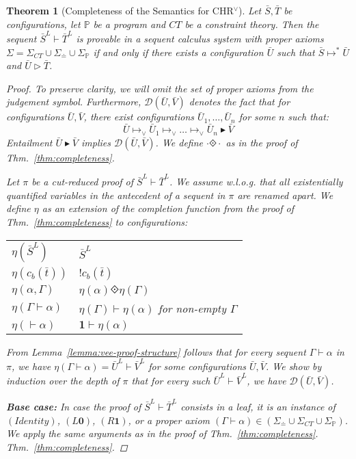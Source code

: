 \documentclass[acmtocl]{acmtrans2m}
\newtheorem{theorem}{Theorem}[section]
\newcommand\ent{\rhd}
\newcommand\entv{\blacktriangleright}
\newcommand{\bbP}{\ensuremath{\mathbb{P}}}
\newcommand{\cD}{\ensuremath{\mathcal{D}}}
\newcommand{\cb}{\ensuremath{c_b(\bar t)}}
\newcommand{\Sct}{\ensuremath{\Sigma_{CT}}}
\newcommand{\Seq}{\ensuremath{\Sigma_{\doteq}}}
\newcommand{\Sp}{\ensuremath{\Sigma_\mathbb{P}}}
\newcommand{\bS}{\bar{S}}
\newcommand{\bT}{\bar{T}}
\newcommand{\bU}{\bar{U}}
\newcommand{\bV}{\bar{V}}
\newcommand{\lone}{\boldsymbol{1}}
\newcommand{\lzero}{\boldsymbol{0}}
\begin{document}
\begin{theorem}[Completeness of the Semantics for CHR$^\vee$]
\label{thm:vee-completeness}
   Let $\bS,\bT$ be configurations, let $\bbP$ be a program and $CT$ be a
   constraint theory. Then the sequent $\bS^L\vdash \bT^L$ is provable in a
   sequent calculus system with proper axioms $\Sigma=\Sct\cup\Seq\cup\Sp$
   \emph{if and only if} there exists a configuration $\bU$ such that
   $\bS\mapsto^{*} \bU$ and $\bU\ent \bT$.

\begin{proof}
To preserve clarity, we will omit the set of proper axioms from the judgement
symbol. Furthermore, $\cD(\bU,\bV)$ denotes the fact that for configurations
$\bU,\bV$,  there exist configurations $\bU_1,\ldots,\bU_n$ for some $n$ such
that:
	\[
		\bU \mapsto_\vee \bU_1 \mapsto_\vee \ldots \mapsto_\vee \bU_n \entv \bV
	\]
Entailment $\bU\entv \bV$ implies $\cD(\bU,\bV)$. We define
$\cdot\Diamonddot\cdot$ as in the proof of Thm.~\ref{thm:completeness}.

Let $\pi$ be a cut-reduced proof of $\bS^L\vdash \bT^L$.
We assume w.l.o.g. that all existentially quantified variables
in the antecedent of a sequent in $\pi$ are renamed apart. We define $\eta$ as an
extension of the completion function from the proof
of Thm.~\ref{thm:completeness} to configurations:

	\medskip
	\begin{tabular}{l @{\hspace{1mm} $::=$ \hspace{1mm}} l}
	  $\eta(\bS^L)$ & $\bS^L$ \\
	  $\eta(\cb)$ & $!\cb$ \\
	  $\eta(\alpha,\Gamma)$ & $\eta(\alpha)\Diamonddot\eta(\Gamma)$ \\
	  $\eta(\Gamma\vdash\alpha)$ & $\eta(\Gamma)\vdash\eta(\alpha)$
	  	\quad for non-empty $\Gamma$ \\
	  $\eta(\vdash\alpha)$ & $\lone\vdash\eta(\alpha)$ \\
	\end{tabular}

	\medskip
	From Lemma~\ref{lemma:vee-proof-structure} follows that for every
	sequent $\Gamma\vdash\alpha$ in $\pi$, we have
	$\eta(\Gamma\vdash\alpha)=\bU^L\vdash\bV^L$ for some configurations $\bU,\bV$. We
	show by induction over the depth of $\pi$ that for every such $\bU^L\vdash
	\bV^L$, we have $\cD(\bU,\bV)$.

	\textbf{Base case:}
	In case the proof of $\bS^L\vdash \bT^L$ consists in a leaf, it is
	an instance of $(Identity)$, $(L\lzero)$, $(R\lone)$, or a proper axiom
	$(\Gamma\vdash\alpha)\in(\Seq\cup\Sct\cup\Sp)$.
	We apply the same arguments as in the proof of Thm.~\ref{thm:completeness}.
	Thm.~\ref{thm:completeness}.


\end{proof}
\end{theorem}
\end{document}
